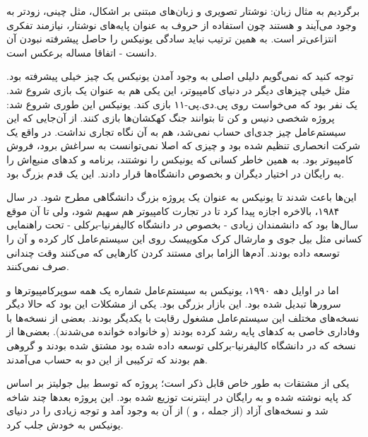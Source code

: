 برگردیم به مثال زبان‌: نوشتار تصویری و زبان‌های مبتنی بر اشکال، مثل
چینی، زودتر به وجود می‌آیند و  هستند چون استفاده از
حروف به عنوان پایه‌های نوشتار، نیازمند تفکری انتزاعی‌تر است. به همین
ترتیب نباید سادگی یونیکس را حاصل پیشرفته‌ نبودن آن دانست - اتفاقا مساله
برعکس است.

توجه کنید که نمی‌گویم دلیلی اصلی به وجود آمدن یونیکس یک چیز خیلی
پیشرفته بود. مثل خیلی چیزهای دیگر در دنیای کامپیوتر، این یکی هم به
عنوان یک بازی شروع شد. یک نفر بود که می‌خواست روی
پی.دی.پی-۱۱ بازی کند. یونیکس این طوری شروع
شد: پروژه شخصی دنیس و کن تا بتوانند جنگ کهکشان‌ها بازی کنند. از آن‌جایی
که این سیستم‌عامل چیز جدی‌ای حساب نمی‌شد،  هم به آن نگاه تجاری
نداشت. در واقع  یک شرکت انحصاری تنظیم شده بود و چیزی که اصلا
نمی‌توانست به سراغش برود، فروش کامپیوتر بود. به همین خاطر کسانی که
یونیکس را نوشتند، برنامه و کدهای منبع‌اش را به رایگان در اختیار دیگران
و بخصوص دانشگاه‌ها قرار دادند. این یک قدم بزرگ بود.

این‌ها باعث شدند تا یونیکس به عنوان یک پروژه بزرگ دانشگاهی مطرح شود. در
سال ۱۹۸۴، بالاخره  اجازه پیدا کرد تا در تجارت کامپیوتر هم
سهیم شود، ولی تا آن موقع سال‌ها بود که دانشمندان زیادی - بخصوص در
دانشگاه کالیفرنیا-برکلی - تحت راهنمایی کسانی مثل بیل
جوی و مارشال کرک مکوییسک روی این سیستم‌عامل کار کرده و آن را توسعه داده بودند. آدم‌ها
الزاما برای مستند کردن کارهایی که می‌کنند وقت چندانی صرف نمی‌کنند.

اما در اوایل دهه ۱۹۹۰، یونیکس به سیستم‌عامل شماره یک همه سوپرکامپیوترها
و سرورها تبدیل شده بود. این بازار بزرگی بود. یکی از مشکلات این بود که
حالا دیگر نسخه‌های مختلف این سیستم‌عامل مشغول رقابت با یکدیگر
بودند. بعضی از نسخه‌ها با وفاداری خاصی به کدهای پایه  رشد
کرده بودند (و خانواده  خوانده می‌شدند). بعضی‌ها از نسخه
 که در دانشگاه کالیفرنیا-برکلی توسعه داده شده بود
مشتق شده بودند و گروهی هم بودند که ترکیبی از این دو به حساب می‌آمدند.

یکی از مشتقات  به طور خاص قابل ذکر است؛ پروژه  که
توسط بیل جولیتز بر اساس کد پایه  نوشته
شده و به رایگان در اینترنت توزیع شده بود. این پروژه بعدها چند شاخه شد
و نسخه‌های آزاد  (از جمله ،  و
) از آن به وجود آمد و توجه زیادی را در دنیای یونیکس به
خودش جلب کرد.

